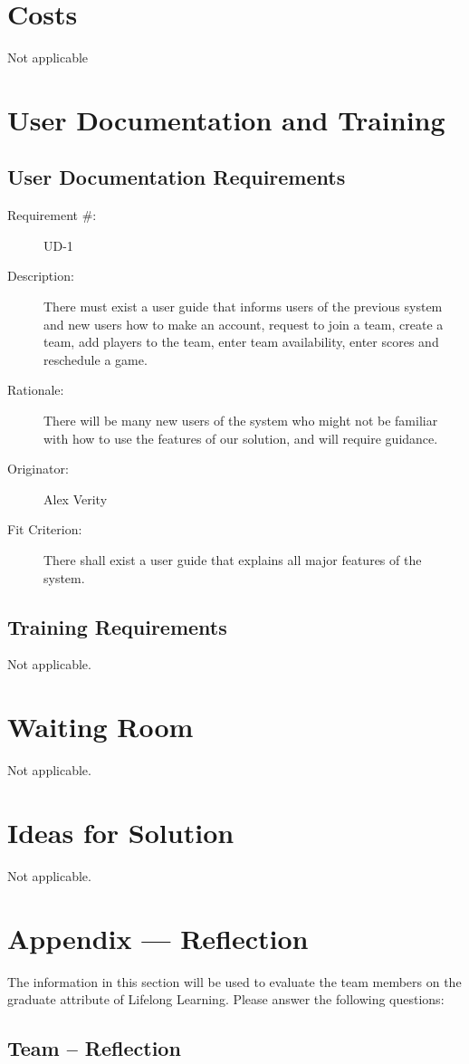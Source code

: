 \documentclass[12pt]{article}
\newenvironment{myreq}[1]{%
\setlist[description]{font=\normalfont\color{darkgray}}%
\begin{tcolorbox}[colframe=black,colback=white, sharp corners, boxrule=1pt]%
\bfseries\color{blue}%
\begin{description}#1}%
{\end{description}\end{tcolorbox}}
\newcommand{\twoinline}[2]{\begin{multicols}{2}#1 #2\end{multicols}}
\newcommand{\reqno}{\item[Requirement \#:]}
\newcommand{\reqdesc}{\item[Description:]}
\newcommand{\reqrat}{\item[Rationale:]}
\newcommand{\reqorig}{\item[Originator:]}
\newcommand{\reqfit}{\item[Fit Criterion:]}
\newcommand{\reqsatis}{\item[Customer Satisfaction:]}
\newcommand{\reqdissat}{\item[Customer Dissatisfaction:]}
\begin{document}
\section{Costs}
Not applicable
\section{User Documentation and Training}
\subsection{User Documentation Requirements}

\begin{myreq}
  \reqno UD-1
  \reqdesc There must exist a user guide that informs users of the previous
  system and new users how to make an account, request to join a team, create
  a team, add players to the team, enter team availability, enter scores and
  reschedule a game.
  \reqrat There will be many new users of the system who might not be familiar
  with how to use the features of our solution, and will require guidance.
  \reqorig Alex Verity
  \reqfit There shall exist a user guide that explains all major features of
  the system.
  \twoinline
    {\reqsatis 3}
    {\reqdissat 1}
\end{myreq}

\subsection{Training Requirements}
Not applicable.

\section{Waiting Room}
Not applicable.

\section{Ideas for Solution}
Not applicable.

\newpage{}
\section*{Appendix --- Reflection}

The information in this section will be used to evaluate the team members on the
graduate attribute of Lifelong Learning.  Please answer the following questions:

\subsection*{Team -- Reflection}
\end{document}
